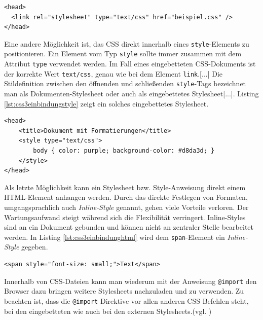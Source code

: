 \vspace{1em}
\begin{lstlisting}[language=HTML5, caption=Stylesheet Einbindung über \texttt{link}-Element, label=lst:css3einbindunglink]
<head>
  <link rel="stylesheet" type="text/css" href="beispiel.css" />
</head>
\end{lstlisting}

Eine andere Möglichkeit ist, das CSS direkt innerhalb eines \texttt{style}-Elements zu positionieren. Ein Element vom Typ \glqq [...] \texttt{style} sollte immer zusammen mit dem Attribut \texttt{type} verwendet werden. Im Fall eines eingebetteten CSS-Dokuments ist der korrekte Wert \texttt{text/css}, genau wie bei dem Element \texttt{link}.[...] Die Stildefinition zwischen den öffnenden und schließenden \texttt{style}-Tags bezeichnet man als Dokumenten-Stylesheet oder auch als eingebettetes Stylesheet[...].\grqq{}\cite[S.19]{MeyeCasc2005} Listing \ref{lst:css3einbindungstyle} zeigt ein solches eingebettetes Stylesheet.

\vspace{1em}
\begin{lstlisting}[language=HTML5, caption=Stylesheet Einbindung über \texttt{style}-Element, label=lst:css3einbindungstyle]
<head>
	<title>Dokument mit Formatierungen</title>
	<style type="text/css">
		body { color: purple; background-color: #d8da3d; }
	</style>
</head>
\end{lstlisting}
	
Als letzte Möglichkeit kann ein Stylesheet bzw. Style-Anweisung direkt einem HTML-Element anhangen werden. \glqq Durch das direkte Festlegen von Formaten, umgangsprachlich auch \textit{Inline-Style} genannt, gehen viele Vorteile verloren. Der Wartungsaufwand steigt während sich die Flexibilität verringert. Inline-Styles sind an ein Dokument gebunden und können nicht an zentraler Stelle bearbeitet werden.\grqq{}\cite{SelfHtml20144} In Listing \ref{lst:css3einbindunghtml} wird dem \texttt{span}-Element ein \textit{Inline-Style} gegeben.

\vspace{1em}
\begin{lstlisting}[language=HTML5, caption=Stylesheet Einbindung in \texttt{html}-Element, label=lst:css3einbindunghtml]
<span style="font-size: small;">Text</span>
\end{lstlisting}
	
Innerhalb von CSS-Dateien kann man wiederum mit der Anweisung \texttt{@import} den Browser dazu bringen weitere Stylesheets nachzuladen und zu verwenden. Zu beachten ist, dass die \texttt{@import} Direktive vor allen anderen CSS Befehlen steht, bei den eingebetteten wie auch bei den externen Stylesheets.(vgl. \cite[S.20]{MeyeCasc2005})

